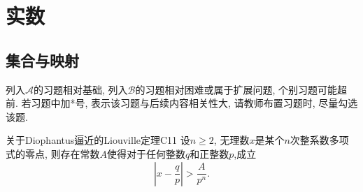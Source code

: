 \chapter{实数}
\section{集合与映射}
\begin{tcolorbox}
列入\(\mathcal{A} \)的习题相对基础, 列入\(\mathcal{B}\)的习题相对困难或属于扩展问题, 个别习题可能超前. 若习题中加*号, 表示该习题与后续内容相关性大, 请教师布置习题时, 尽量勾选该题.
\end{tcolorbox}
\begin{theorem}{关于Diophantus逼近的Liouville定理}{C11}
    设\(n\geqslant 2\), 无理数\(x\)是某个\(n\)次整系数多项式的零点, 则存在常数\(A\)使得对于任何整数\(q\)和正整数\(p\),成立\[\left|x-\frac{q}{p}\right|>\frac{A}{p^n}.\]
\end{theorem}
